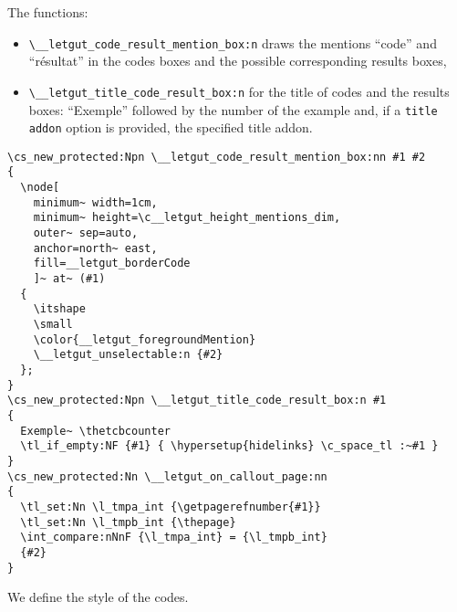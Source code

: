 \documentclass{letgut}
\begin{document}
The functions:

\begin{itemize}
\item \lstinline+\__letgut_code_result_mention_box:n+ draws the mentions “code” and “résultat”
in the codes boxes and the possible corresponding results boxes,
\item \lstinline+\__letgut_title_code_result_box:n+ for the title of codes and the results
boxes: “Exemple” followed by the number of the example and, if a \lstinline+title addon+
option is provided, the specified title addon.
\end{itemize}

\begin{lstlisting}
\cs_new_protected:Npn \__letgut_code_result_mention_box:nn #1 #2
{
  \node[
    minimum~ width=1cm,
    minimum~ height=\c__letgut_height_mentions_dim,
    outer~ sep=auto,
    anchor=north~ east,
    fill=__letgut_borderCode
    ]~ at~ (#1)
  {
    \itshape
    \small
    \color{__letgut_foregroundMention}
    \__letgut_unselectable:n {#2}
  };
}
\cs_new_protected:Npn \__letgut_title_code_result_box:n #1
{
  Exemple~ \thetcbcounter
  \tl_if_empty:NF {#1} { \hypersetup{hidelinks} \c_space_tl :~#1 }
}
\cs_new_protected:Nn \__letgut_on_callout_page:nn
{
  \tl_set:Nn \l_tmpa_int {\getpagerefnumber{#1}}
  \tl_set:Nn \l_tmpb_int {\thepage}
  \int_compare:nNnF {\l_tmpa_int} = {\l_tmpb_int}
  {#2}
}
\end{lstlisting}

We define the style of the codes.
\end{document}
